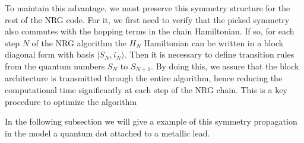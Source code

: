 To maintain  this advantage, we must preserve this symmetry structure for the rest of the NRG code. For it, we first need to verify that the picked symmetry also commutes with the hopping terms in the chain Hamiltonian. If so, for each step  $N$ of the NRG algorithm  the $H_N$ Hamiltonian can be written in a block diagonal form with basis 
$\vert S_N, i_N\rangle$. Then it is necessary to define transition rules from the quantum numbers $S_N$ to $S_{N+1}$. By doing this, we assure that the block architecture is transmitted through the entire algorithm, hence reducing the computational time significantly at each step of the NRG chain. This is a key procedure to optimize the algorithm


In the following subsection we will give a example of this symmetry propagation in the model a quantum dot attached to a metallic lead. 








 




